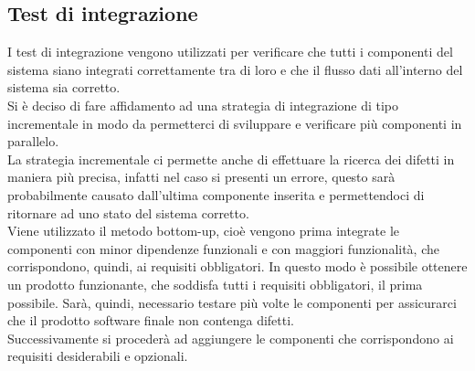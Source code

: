 	\subsection{Test di integrazione}
		I test di integrazione vengono utilizzati per verificare che tutti i componenti del sistema siano integrati correttamente tra di loro e che il flusso dati all'interno del sistema sia corretto.\\
		Si è deciso di fare affidamento ad una strategia di integrazione di tipo incrementale in modo da permetterci di sviluppare e verificare più componenti in parallelo.\\
		La strategia incrementale ci permette anche di effettuare la ricerca dei difetti in maniera più precisa, infatti nel caso si presenti un errore, questo sarà probabilmente causato dall'ultima componente inserita e permettendoci di ritornare ad uno stato del sistema corretto.\\
		Viene utilizzato il metodo bottom-up, cioè vengono prima integrate le componenti con minor dipendenze funzionali e con maggiori funzionalità, che corrispondono, quindi, ai requisiti obbligatori. In questo modo è possibile ottenere un prodotto funzionante, che soddisfa tutti i requisiti obbligatori, il prima possibile. Sarà, quindi, necessario testare più volte le componenti per assicurarci che il prodotto software finale non contenga difetti.\\ Successivamente si procederà ad aggiungere le componenti che corrispondono ai requisiti desiderabili e opzionali.
		 
